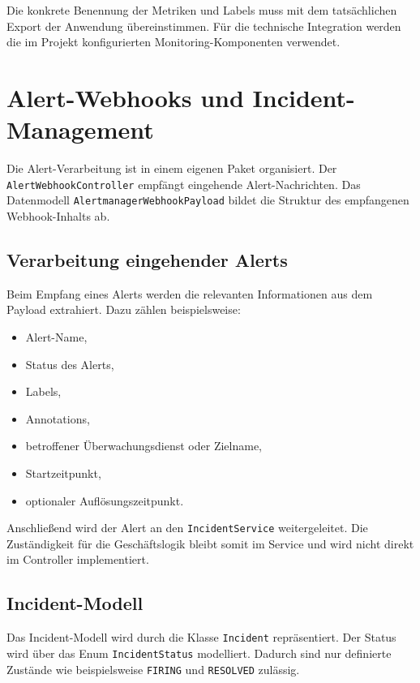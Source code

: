 Die konkrete Benennung der Metriken und Labels muss mit dem tatsächlichen Export der Anwendung übereinstimmen. Für die technische Integration werden die im Projekt konfigurierten Monitoring-Komponenten verwendet.

\section{Alert-Webhooks und Incident-Management}
\label{sec:alert-incident-implementierung}

Die Alert-Verarbeitung ist in einem eigenen Paket organisiert. Der \texttt{AlertWebhookController} empfängt eingehende Alert-Nachrichten. Das Datenmodell \texttt{AlertmanagerWebhookPayload} bildet die Struktur des empfangenen Webhook-Inhalts ab.

\subsection{Verarbeitung eingehender Alerts}
\label{subsec:alert-verarbeitung}

Beim Empfang eines Alerts werden die relevanten Informationen aus dem Payload extrahiert. Dazu zählen beispielsweise:

\begin{itemize}
    \item Alert-Name,
    \item Status des Alerts,
    \item Labels,
    \item Annotations,
    \item betroffener Überwachungsdienst oder Zielname,
    \item Startzeitpunkt,
    \item optionaler Auflösungszeitpunkt.
\end{itemize}

Anschließend wird der Alert an den \texttt{IncidentService} weitergeleitet. Die Zuständigkeit für die Geschäftslogik bleibt somit im Service und wird nicht direkt im Controller implementiert.

\subsection{Incident-Modell}
\label{subsec:incident-modell-implementierung}

Das Incident-Modell wird durch die Klasse \texttt{Incident} repräsentiert. Der Status wird über das Enum \texttt{IncidentStatus} modelliert. Dadurch sind nur definierte Zustände wie beispielsweise \texttt{FIRING} und \texttt{RESOLVED} zulässig.


